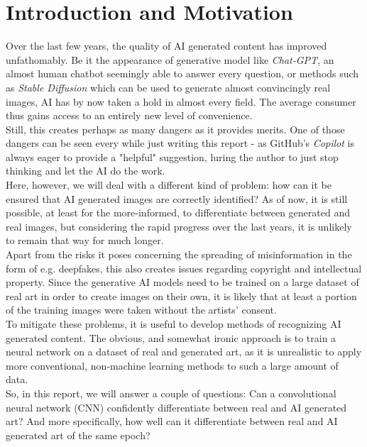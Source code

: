 \chapter{Introduction and Motivation}
\label{ch:intro}

Over the last few years, the quality of AI generated content has improved unfathomably.
Be it the appearance of generative model like \textit{Chat-GPT}, an almost human chatbot seemingly able to answer every question,
or methods such as \textit{Stable Diffusion} which can be used to generate almost convincingly real images, 
AI has by now taken a hold in almost every field. 
The average consumer thus gains access to an entirely new level of convenience. \\

Still, this creates perhaps as many dangers as it provides merits.
One of those dangers can be seen every while just writing this report - as GitHub's \textit{Copilot} is always eager to provide a "helpful" suggestion,
luring the author to just stop thinking and let the AI do the work. \\

Here, however, we will deal with a different kind of problem: how can it be ensured that AI generated images are correctly identified?
As of now, it is still possible, at least for the more-informed, to differentiate between generated and real images, but considering the rapid progress over the last years,
it is unlikely to remain that way for much longer. \\ %

Apart from the risks it poses concerning the spreading of misinformation in the form of e.g. deepfakes, this also creates issues regarding copyright and intellectual property.
Since the generative AI models need to be trained on a large dataset of real art in order to create images on their own, it is likely that at least a portion of the training images
were taken without the artists' consent. \\

To mitigate these problems, it is useful to develop methods of recognizing AI generated content.
The obvious, and somewhat ironic approach is to train a neural network on a dataset of real and generated art, 
as it is unrealistic to apply more conventional, non-machine learning methods to such a large amount of data. \\

So, in this report, we will answer a couple of questions: Can a convolutional neural network (CNN) confidently differentiate between real and AI generated art?
And more specifically, how well can it differentiate between real and AI generated art of the same epoch? \\






